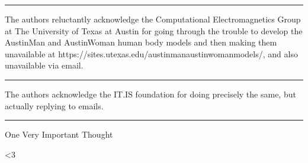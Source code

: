 \documentclass[paper.tex]{subfiles}
\begin{document}
\rule{\linewidth}{0.2pt}

The authors reluctantly acknowledge the Computational Electromagnetics Group at The University of Texas at Austin for going through the trouble to develop the AustinMan and AustinWoman human body models and then making them unavailable at https://sites.utexas.edu/austinmanaustinwomanmodels/, and also unavailable via email.

\rule{\linewidth}{0.2pt}

The authors acknowledge the IT.IS foundation for doing precisely the same, but actually replying to emails.

\rule{\linewidth}{0.2pt}

One Very Important Thought



{\Large <3}
\end{document}
